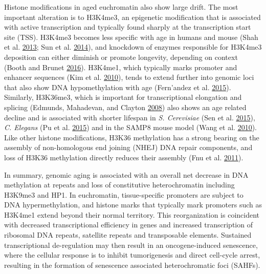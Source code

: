 \documentclass[onehalf,12pt]{beavtex}
\begin{document}
  Histone modifications in aged euchromatin also show large drift. The
  most important alteration is to H3K4me3, an epigenetic modification that
  is associated with active transcription and typically found sharply at
  the transcription start site (TSS). H3K4me3 becomes less specific with
  age in humans and mouse (Shah et al.
  \protect\hyperlink{ref-ShahLaminB1depletion2013}{2013}; Sun et al.
  \protect\hyperlink{ref-SunEpigenomicprofilingyoung2014}{2014}), and
  knockdown of enzymes responsible for H3K4me3 deposition can either
  diminish or promote longevity, depending on context (Booth and Brunet
  \protect\hyperlink{ref-BoothAgingEpigenome2016a}{2016}). H3K4me1, which
  typically marks promoter and enhancer sequences (Kim et al.
  \protect\hyperlink{ref-KimWidespreadtranscriptionneuronal2010}{2010}),
  tends to extend further into genomic loci that also show DNA
  hypomethylation with age (Fern\a'andez et al.
  \protect\hyperlink{ref-FernandezH3K4me1marksDNA2015}{2015}). Similarly,
  H3K36me3, which is important for transcriptional elongation and splicing
  (Edmunds, Mahadevan, and Clayton
  \protect\hyperlink{ref-EdmundsDynamichistoneH32008a}{2008}) also shows
  an age related decline and is associated with shorter lifespan in
  \emph{S. Cerevisiae} (Sen et al.
  \protect\hyperlink{ref-SenH3K36methylationpromotes2015}{2015}), \emph{C.
  Elegans} (Pu et al.
  \protect\hyperlink{ref-PuTrimethylationLys36H32015}{2015}) and in the
  SAMP8 mouse model (Wang et al.
  \protect\hyperlink{ref-WangIdentificationhistonemethylation2010}{2010}).
  Like other histone modifications, H3K36 methylation has a strong bearing
  on the assembly of non-homologous end joining (NHEJ) DNA repair
  components, and loss of H3K36 methylation directly reduces their
  assembly (Fnu et al.
  \protect\hyperlink{ref-FnuMethylationhistoneH32011}{2011}).
  
  In summary, genomic aging is associated with an overall net decrease in
  DNA methylation at repeats and loss of constitutive heterochromatin
  including H3K9me3 and HP1. In euchromatin, tissue-specific promoters are
  subject to DNA hypermethylation, and histone marks that typically mark
  promoters such as H3K4me1 extend beyond their normal territory. This
  reorganization is coincident with decreased transcriptional efficiency
  in genes and increased transcription of ribosomal DNA repeats, satellite
  repeats and transposable elements. Sustained transcriptional
  de-regulation may then result in an oncogene-induced senescence, where
  the cellular response is to inhibit tumorigenesis and direct cell-cycle
  arrest, resulting in the formation of senescence associated
  heterochromatic foci (SAHFs).
  
\end{document}
